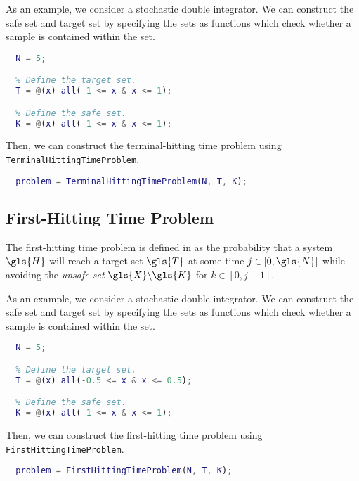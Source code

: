 \documentclass[11pt]{article}
\begin{document}
As an example, we consider a stochastic double integrator.
We can construct the safe set and target set by specifying the sets as functions which check whether a sample is contained within the set.
\begin{lstlisting}[language=Matlab]
  % Define the time horizon.
  N = 5;

  % Define the target set.
  T = @(x) all(-1 <= x & x <= 1);

  % Define the safe set.
  K = @(x) all(-1 <= x & x <= 1);
\end{lstlisting}
Then, we can construct the terminal-hitting time problem using \verb|TerminalHittingTimeProblem|.
\begin{lstlisting}[language=Matlab, firstnumber=last]
  % Define the terminal-hitting time problem.
  problem = TerminalHittingTimeProblem(N, T, K);
\end{lstlisting}


\subsection{First-Hitting Time Problem}
\label{section: first-hitting time problem}

The first-hitting time problem is defined in \cite{summers2010verification} as the probability that a system $\gls{H}$ will reach a target set $\gls{T}$ at some time $j \in [0, \gls{N}]$ while avoiding the \emph{unsafe set} $\gls{X}\backslash\gls{K}$ for $k \in [0, j-1]$.

As an example, we consider a stochastic double integrator.
We can construct the safe set and target set by specifying the sets as functions which check whether a sample is contained within the set.
\begin{lstlisting}[language=Matlab]
  % Define the time horizon.
  N = 5;

  % Define the target set.
  T = @(x) all(-0.5 <= x & x <= 0.5);

  % Define the safe set.
  K = @(x) all(-1 <= x & x <= 1);
\end{lstlisting}
Then, we can construct the first-hitting time problem using \verb|FirstHittingTimeProblem|.
\begin{lstlisting}[language=Matlab, firstnumber=last]
  % Define the first-hitting time problem.
  problem = FirstHittingTimeProblem(N, T, K);
\end{lstlisting}
\end{document}
